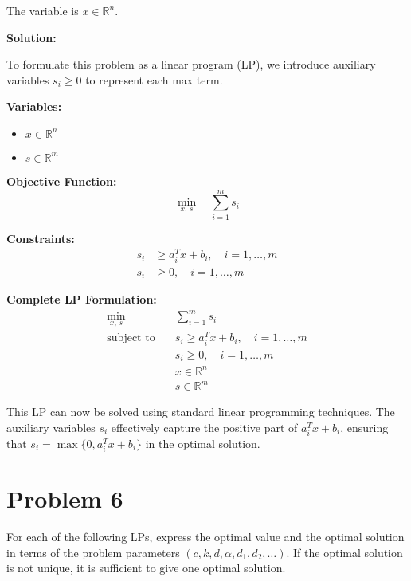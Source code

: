 \documentclass{article}
\begin{document}
The variable is $x \in \mathbb{R}^n$.

\textbf{Solution:}

To formulate this problem as a linear program (LP), we introduce auxiliary variables $s_i \geq 0$ to represent each max term.

\textbf{Variables:}
\begin{itemize}
    \item $x \in \mathbb{R}^n$
    \item $s \in \mathbb{R}^m$
\end{itemize}

\textbf{Objective Function:}
\[
\min_{x,\,s} \quad \sum_{i=1}^m s_i
\]

\textbf{Constraints:}
\begin{align*}
s_i &\geq a_i^T x + b_i, \quad i = 1, \ldots, m \\
s_i &\geq 0, \quad i = 1, \ldots, m
\end{align*}

\textbf{Complete LP Formulation:}
\begin{align*}
\min_{x,\,s} \quad & \sum_{i=1}^m s_i \\
\text{subject to} \quad & s_i \geq a_i^T x + b_i, \quad i = 1, \ldots, m \\
& s_i \geq 0, \quad i = 1, \ldots, m \\
& x \in \mathbb{R}^n \\
& s \in \mathbb{R}^m
\end{align*}

This LP can now be solved using standard linear programming techniques. The auxiliary variables $s_i$ effectively capture the positive part of $a_i^T x + b_i$, ensuring that $s_i = \max\{0, a_i^T x + b_i\}$ in the optimal solution.


\section*{Problem 6}

For each of the following LPs, express the optimal value and the optimal solution in terms of the problem parameters $(c, k, d, \alpha, d_1, d_2, \ldots)$. If the optimal solution is not unique, it is sufficient to give one optimal solution.
\end{document}
